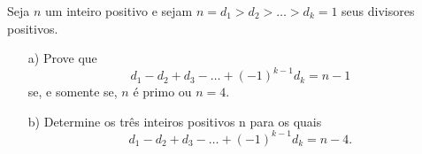 Seja $n$ um inteiro positivo e sejam $n = d_1 > d_2 > \dots > d_k = 1$ seus divisores positivos.

\begin{itemize}
\item[a)] Prove que
$$ d_1 - d_2 + d_3 - \dots + (-1)^{k-1}d_k = n - 1 $$
se, e somente se, $n$ é primo ou $n = 4$.

\item[b)] Determine os três inteiros positivos n para os quais
$$ d_1 - d_2 + d_3 - \dots + (-1)^{k-1}d_k = n - 4.$$
\end{itemize}